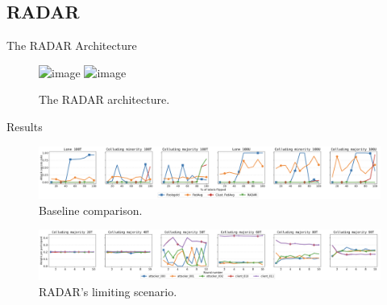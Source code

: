 \subsection*{RADAR}

\begin{frame}
  \subsectionpage
\end{frame}

\begin{frame}{The RADAR Architecture}

  \begin{figure}
    \centering
    \includegraphics<1>[width=.7\textwidth]{figures/radar/architecture}
    \includegraphics<2>[width=.7\textwidth]{figures/radar/architecture-xeval}
    \caption{The RADAR architecture.}
  \end{figure}


\end{frame}

\begin{frame}{Results}
  \begin{figure}
    \centering
    \includegraphics[width=.9\textwidth]{figures/radar/baselines.png}
    \caption{Baseline comparison.}
  \end{figure}
  \begin{figure}
    \centering
    \includegraphics[width=.9\textwidth]{figures/radar/limiting-case.png}
    \caption{RADAR's limiting scenario.}
  \end{figure}
\end{frame}